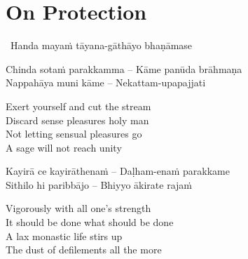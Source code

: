 
\section{On Protection}
\label{protection}

\begin{leader}
  \anglebracketleft\ \hspace{-0.5mm}Handa mayaṁ tāyana-gāthāyo bhaṇāmase \hspace{-0.5mm}\anglebracketright\
\end{leader}

\begin{verses}
  Chinda sotaṁ parakkamma – Kāme panūda brāhmaṇa\\
  Nappahāya muni kāme – Nekattam-upapajjati
\end{verses}

\begin{english-verses}
  Exert yourself and cut the stream\\
  Discard sense pleasures holy man\\
  Not letting sensual pleasures go\\
  A sage will not reach unity\makeatletter\hyperlink{endnote40-appendix}\makeatother
\end{english-verses}

\begin{verses}
  Kayirā ce kayirāthenaṁ – Daḷham-enaṁ parakkame\\
  Sithilo hi paribbājo – Bhiyyo ākirate rajaṁ
\end{verses}

\begin{english-verses}
  Vigorously with all one's strength\\
  It should be done what should be done\\
  A lax monastic life stirs up\\
  The dust of defilements all the more\makeatletter\hyperlink{endnote41-appendix}\makeatother
\end{english-verses}

